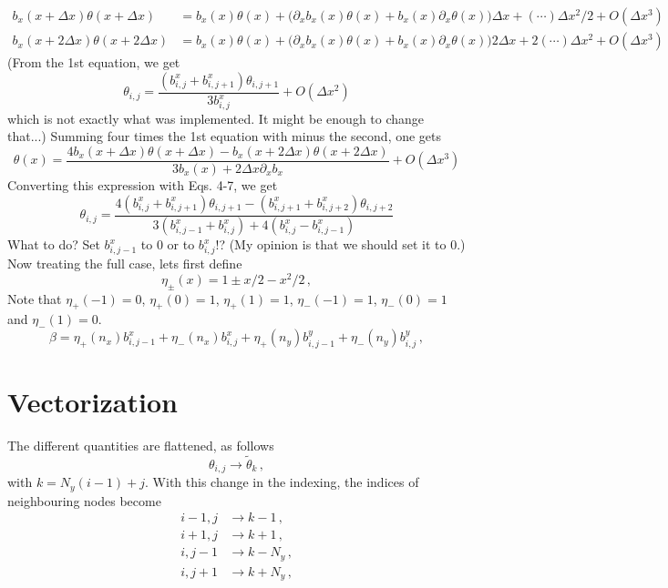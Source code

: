 \documentclass[notitlepage]{revtex4-2}
\begin{document}
\begin{align}
b_x(x+\Delta x)\theta(x+\Delta x) &= b_x(x)\theta(x) + \Big(\partial_x b_x(x) \theta(x)+ b_x(x)\partial_x \theta(x)\Big)\Delta x + (\cdots)\Delta x^2/2 + O(\Delta x^3)\\
b_x(x+2\Delta x)\theta(x+2\Delta x) &= b_x(x)\theta(x) + \Big(\partial_x b_x(x)\theta(x)+ b_x(x)\partial_x \theta(x)\Big)2\Delta x + 2(\cdots)\Delta x^2 + O(\Delta x^3)
\end{align}
(From the 1st equation, we get
\begin{equation}
\theta_{i,j}=\frac{(b^x_{i,j}+b^x_{i,j+1})\theta_{i,j+1}}{3 b^x_{i,j}}+O(\Delta x^2)
\end{equation}
which is not exactly what was implemented. It might be enough to change that...)
Summing four times the 1st equation with minus the second, one gets
\begin{equation}
\theta(x) = \frac{4b_x(x+\Delta x)\theta(x+\Delta x)-b_x(x+2\Delta x)\theta(x+2\Delta x)}{3b_x(x)+2\Delta x\partial_xb_x}+O(\Delta x^3)
\end{equation}
Converting this expression with Eqs. 4-7, we get
\begin{equation}
\theta_{i,j} = \frac{4(b^x_{i,j}+b^x_{i,j+1})\theta_{i,j+1} - (b^x_{i,j+1}+b^x_{i,j+2})\theta_{i,j+2}}{3(b^x_{i,j-1}+b^x_{i,j})+4(b^x_{i,j}-b^x_{i,j-1})}
\end{equation}
What to do? Set $b^x_{i,j-1}$ to $0$ or to $b^x_{i,j}$!? (My opinion is that we should set it to 0.)
Now treating the full case, lets first define 
\begin{equation}
\eta_{\pm}(x) = 1\pm x/2 -x^2/2\,,
\end{equation}
Note that $\eta_{+}(-1)=0$, $\eta_{+}(0)=1$, $\eta_{+}(1)=1$, $\eta_{-}(-1)=1$, $\eta_{-}(0)=1$ and $\eta_{-}(1)=0$.
\begin{equation}
\beta=\eta_{+}(n_x)b^x_{i,j-1}+\eta_{-}(n_x)b^x_{i,j}+\eta_{+}(n_y)b^y_{i,j-1}+\eta_{-}(n_y)b^y_{i,j}\,,
\end{equation}




\section{Vectorization}
The different quantities are flattened, as follows
\begin{equation}
\theta_{i,j} \rightarrow \tilde\theta_k\,,
\end{equation}
with $k = N_y(i-1)+j$. With this change in the indexing, the indices of neighbouring nodes become
\begin{align}
i-1,j &\rightarrow k-1\,,\\
i+1,j &\rightarrow k+1\,,\\
i,j-1 &\rightarrow k-N_y\,,\\
i,j+1 &\rightarrow k+N_y\,,
\end{align}
\end{document}
